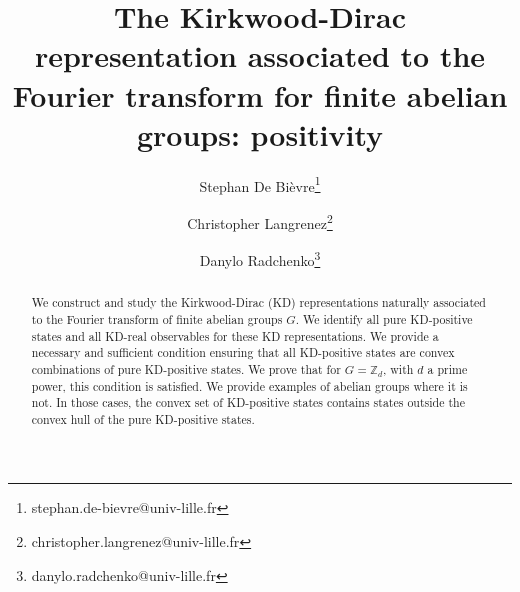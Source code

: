\documentclass[a4paper, notitlepage, 11pt]{article}
\numberwithin{equation}{section}
\newcommand{\Z}{\mathbb{Z}}
\begin{document}
\title{The Kirkwood-Dirac representation associated to the Fourier transform for finite abelian groups: positivity}

\author[,1]{Stephan De Bi\`evre\thanks{stephan.de-bievre@univ-lille.fr}}

\author[,1]{Christopher Langrenez\thanks{christopher.langrenez@univ-lille.fr}}

\author[,2]{Danylo Radchenko\thanks{danylo.radchenko@univ-lille.fr}}



\maketitle

\begin{abstract}
We construct and study the Kirkwood-Dirac (KD) representations naturally associated to the Fourier transform of finite abelian groups $G$. We identify all pure KD-positive states and all KD-real observables for these KD representations. We provide a necessary and sufficient condition ensuring  that all KD-positive states are  convex combinations of pure KD-positive states. We prove  that for $G=\Z_{d}$, with $d$ a prime power, this condition is satisfied.  We provide examples of abelian groups where it is not. In those cases, the convex set of KD-positive states contains states outside the convex hull of the pure KD-positive states. 
\end{abstract}
\end{document}
